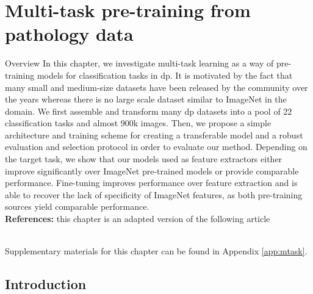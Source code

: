 \chapter{Multi-task pre-training from pathology data}
\label{chap:mtask}


\begin{overview}{Overview}
In this chapter, we investigate multi-task learning as a way of pre-training models for classification tasks in \acrlong{dp}. It is motivated by the fact that many small and medium-size datasets have been released by the community over the years whereas there is no large scale dataset similar to ImageNet in the domain. We first assemble and transform many \acrlong{dp} datasets into a pool of 22 classification tasks and almost 900k images. Then, we propose a simple architecture and training scheme for creating a transferable model and a robust evaluation and selection protocol in order to evaluate our method. Depending on the target task, we show that our models used as feature extractors either improve significantly over ImageNet pre-trained models or provide comparable performance. Fine-tuning improves performance over feature extraction and is able to recover the lack of specificity of ImageNet features, as both pre-training sources yield comparable performance. \\

\textbf{References:} this chapter is an adapted version of the following article

 \\

Supplementary materials for this chapter can be found in Appendix \ref{app:mtask}.
\end{overview}



%


\section{Introduction}

